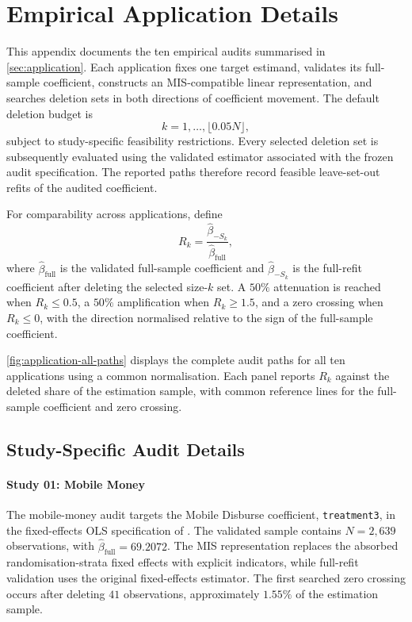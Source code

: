 \documentclass[../main.tex]{subfiles}
\begin{document}
\FloatBarrier
\section{Empirical Application Details}
\label{app:application-details}

This appendix documents the ten empirical audits summarised in \autoref{sec:application}. Each application fixes one target estimand, validates its full-sample coefficient, constructs an MIS-compatible linear representation, and searches deletion sets in both directions of coefficient movement. The default deletion budget is
\[
k=1,\ldots,\lfloor 0.05N\rfloor,
\]
subject to study-specific feasibility restrictions. Every selected deletion set is subsequently evaluated using the validated estimator associated with the frozen audit specification. The reported paths therefore record feasible leave-set-out refits of the audited coefficient.

For comparability across applications, define
\[
R_k
=
\frac{\widehat{\beta}_{-S_k}}
{\widehat{\beta}_{\mathrm{full}}},
\]
where \(\widehat{\beta}_{\mathrm{full}}\) is the validated full-sample coefficient and \(\widehat{\beta}_{-S_k}\) is the full-refit coefficient after deleting the selected size-\(k\) set. A \(50\%\) attenuation is reached when \(R_k\leq0.5\), a \(50\%\) amplification when \(R_k\geq1.5\), and a zero crossing when \(R_k\leq0\), with the direction normalised relative to the sign of the full-sample coefficient.

\autoref{fig:application-all-paths} displays the complete audit paths for all ten applications using a common normalisation. Each panel reports \(R_k\) against the deleted share of the estimation sample, with common reference lines for the full-sample coefficient and zero crossing.


\FloatBarrier
\subsection{Study-Specific Audit Details}

\paragraph*{Study 01: Mobile Money}

The mobile-money audit targets the Mobile Disburse coefficient, \texttt{treatment3}, in the fixed-effects OLS specification of \textcite{riley2024resisting}. The validated sample contains \(N=2{,}639\) observations, with \(\widehat{\beta}_{\mathrm{full}}=69.2072\). The MIS representation replaces the absorbed randomisation-strata fixed effects with explicit indicators, while full-refit validation uses the original fixed-effects estimator. The first searched zero crossing occurs after deleting \(41\) observations, approximately \(1.55\%\) of the estimation sample.
\end{document}
